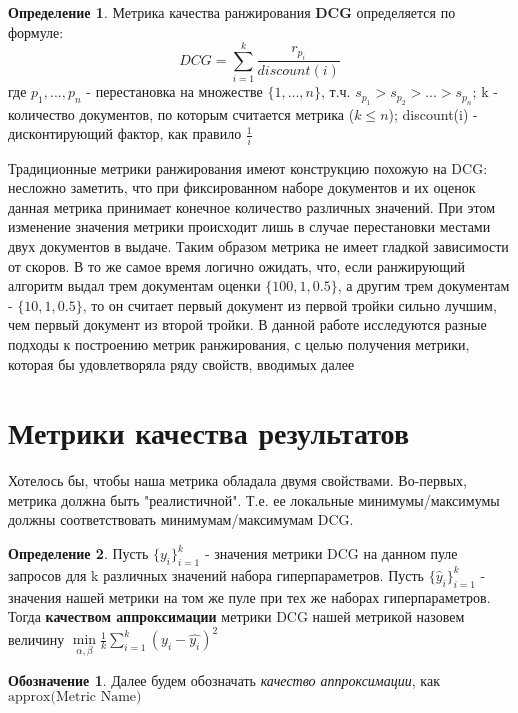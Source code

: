 \documentclass[12pt,a4paper]{amsart}
\theoremstyle{definition}
\newtheorem{definition}{Определение}[section]
\theoremstyle{definition}
\newtheorem{designation}{Обозначение}[section]
\newcommand{\Sum}{\sum\limits}
\renewcommand\i{\textit}
\renewcommand\b{\textbf}
\begin{document}
\begin{definition}
Метрика качества ранжирования \b{DCG} определяется по формуле:
$$DCG = \Sum_{i=1}^k \frac{r_{p_i}}{discount(i)}$$
где $p_1,...,p_n$ - перестановка на множестве $\{1,...,n\}$, т.ч. ${s_{p_1} > s_{p_2} > ... > s_{p_n}}$; k - количество документов, по которым считается метрика ($k \le n$); 
discount(i) - дисконтирующий фактор, как правило $\frac{1}{i}$
\end{definition}

Традиционные метрики ранжирования имеют конструкцию похожую на DCG: несложно заметить, что при фиксированном наборе документов и их оценок данная метрика принимает конечное количество различных значений. При этом изменение значения метрики происходит лишь в случае перестановки местами двух документов в выдаче. Таким образом метрика не имеет гладкой зависимости от скоров. В то же самое время логично ожидать, что, если ранжирующий алгоритм выдал трем документам оценки $\{100, 1, 0.5\}$, а другим трем документам - $\{10, 1, 0.5\}$, то он считает первый документ из первой тройки сильно лучшим, чем первый документ из второй тройки.
В данной работе исследуются разные подходы к построению метрик ранжирования, с целью получения метрики, которая бы удовлетворяла ряду свойств, вводимых далее


\newpage
\section{Метрики качества результатов}

Хотелось бы, чтобы наша метрика обладала двумя свойствами. Во-первых, метрика должна быть "реалистичной". Т.е. ее локальные минимумы/максимумы должны соответствовать минимумам/максимумам DCG.
\begin{definition}
Пусть $\{y_i\}_{i=1}^k$ - значения метрики DCG на данном пуле запросов для k различных значений набора гиперпараметров. Пусть $\{\hat{y}_i\}_{i=1}^k$ - значения нашей метрики на том же пуле при тех же наборах гиперпараметров. Тогда \b{качеством аппроксимации} метрики DCG нашей метрикой назовем величину
$\underset{\alpha, \beta}{\min}\frac{1}{k}\Sum_{i=1}^k (y_i - \hat{y_i})^2$
\end{definition}

\begin{designation}
Далее будем обозначать \i{качество аппроксимации}, как $\text{approx(Metric Name)}$
\end{designation}
\end{document}
